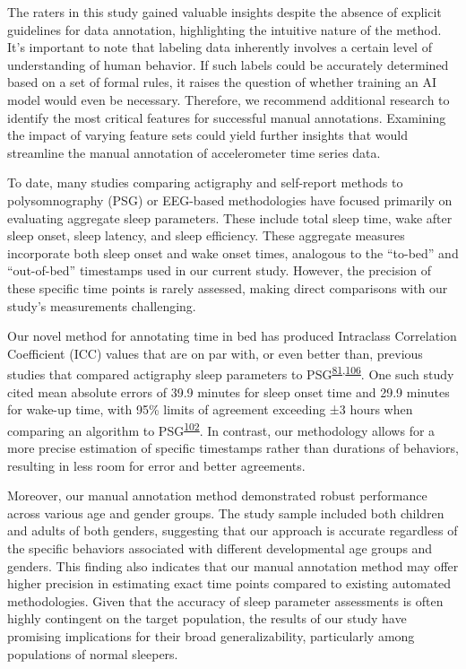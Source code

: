 \documentclass[
  9pt,
]{scrbook}
\begin{document}
The raters in this study gained valuable insights despite the absence of
explicit guidelines for data annotation, highlighting the intuitive
nature of the method. It's important to note that labeling data
inherently involves a certain level of understanding of human behavior.
If such labels could be accurately determined based on a set of formal
rules, it raises the question of whether training an AI model would even
be necessary. Therefore, we recommend additional research to identify
the most critical features for successful manual annotations. Examining
the impact of varying feature sets could yield further insights that
would streamline the manual annotation of accelerometer time series
data.

To date, many studies comparing actigraphy and self-report methods to
polysomnography (PSG) or EEG-based methodologies have focused primarily
on evaluating aggregate sleep parameters. These include total sleep
time, wake after sleep onset, sleep latency, and sleep efficiency. These
aggregate measures incorporate both sleep onset and wake onset times,
analogous to the ``to-bed'' and ``out-of-bed'' timestamps used in our
current study. However, the precision of these specific time points is
rarely assessed, making direct comparisons with our study's measurements
challenging.

Our novel method for annotating time in bed has produced Intraclass
Correlation Coefficient (ICC) values that are on par with, or even
better than, previous studies that compared actigraphy sleep parameters
to
PSG\textsuperscript{\protect\hyperlink{ref-haghayegh_application_2020}{81},\protect\hyperlink{ref-yavuz-kodat_2019}{106}}.
One such study cited mean absolute errors of 39.9 minutes for sleep
onset time and 29.9 minutes for wake-up time, with 95\% limits of
agreement exceeding ±3 hours when comparing an algorithm to
PSG\textsuperscript{\protect\hyperlink{ref-van_hees_estimating_2018}{102}}.
In contrast, our methodology allows for a more precise estimation of
specific timestamps rather than durations of behaviors, resulting in
less room for error and better agreements.

Moreover, our manual annotation method demonstrated robust performance
across various age and gender groups. The study sample included both
children and adults of both genders, suggesting that our approach is
accurate regardless of the specific behaviors associated with different
developmental age groups and genders. This finding also indicates that
our manual annotation method may offer higher precision in estimating
exact time points compared to existing automated methodologies. Given
that the accuracy of sleep parameter assessments is often highly
contingent on the target population, the results of our study have
promising implications for their broad generalizability, particularly
among populations of normal sleepers.
\end{document}
